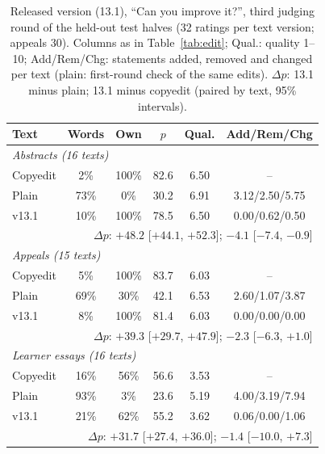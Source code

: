 \documentclass[11pt]{article}
\newcommand{\shipver}{13.1}
\begin{document}
\begin{table}[t]
\centering\small
\setlength{\tabcolsep}{2.2pt}
\begin{tabular}{lccccc}
\toprule
Text & Words & Own & $p$ & Qual. & Add/Rem/Chg \\
\midrule
\multicolumn{6}{l}{\emph{Abstracts (16 texts)}} \\
Copyedit & 2\% & 100\% & 82.6 & 6.50 & -- \\
Plain & 73\% & 0\% & 30.2 & 6.91 & 3.12/2.50/5.75 \\
v\shipver{} & 10\% & 100\% & 78.5 & 6.50 & 0.00/0.62/0.50 \\
\multicolumn{6}{r}{$\Delta p$: $+48.2$ [$+44.1$, $+52.3$]; $-4.1$ [$-7.4$, $-0.9$]} \\
\midrule
\multicolumn{6}{l}{\emph{Appeals (15 texts)}} \\
Copyedit & 5\% & 100\% & 83.7 & 6.03 & -- \\
Plain & 69\% & 30\% & 42.1 & 6.53 & 2.60/1.07/3.87 \\
v\shipver{} & 8\% & 100\% & 81.4 & 6.03 & 0.00/0.00/0.00 \\
\multicolumn{6}{r}{$\Delta p$: $+39.3$ [$+29.7$, $+47.9$]; $-2.3$ [$-6.3$, $+1.0$]} \\
\midrule
\multicolumn{6}{l}{\emph{Learner essays (16 texts)}} \\
Copyedit & 16\% & 56\% & 56.6 & 3.53 & -- \\
Plain & 93\% & 3\% & 23.6 & 5.19 & 4.00/3.19/7.94 \\
v\shipver{} & 21\% & 62\% & 55.2 & 3.62 & 0.06/0.00/1.06 \\
\multicolumn{6}{r}{$\Delta p$: $+31.7$ [$+27.4$, $+36.0$]; $-1.4$ [$-10.0$, $+7.3$]} \\
\bottomrule
\end{tabular}
\caption{Released version (\shipver{}), ``Can you improve it?'', third judging round of the held-out test halves (32 ratings per text version; appeals 30). Columns as in Table~\ref{tab:edit}; Qual.: quality 1--10; Add/Rem/Chg: statements added, removed and changed per text (plain: first-round check of the same edits). $\Delta p$: \shipver{} minus plain; \shipver{} minus copyedit (paired by text, 95\% intervals).}
\label{tab:v131}
\end{table}
\end{document}
